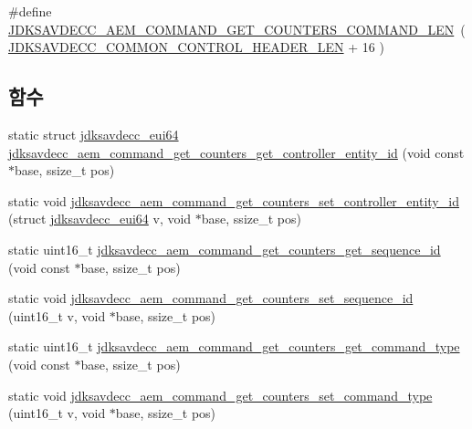 \begin{DoxyCompactItemize}
\item 
\#define \hyperlink{group__command__get__counters_ga172bfd9e43b26f1b23588cdc172e6940}{J\+D\+K\+S\+A\+V\+D\+E\+C\+C\+\_\+\+A\+E\+M\+\_\+\+C\+O\+M\+M\+A\+N\+D\+\_\+\+G\+E\+T\+\_\+\+C\+O\+U\+N\+T\+E\+R\+S\+\_\+\+C\+O\+M\+M\+A\+N\+D\+\_\+\+L\+EN}~( \hyperlink{group__jdksavdecc__avtp__common__control__header_gaae84052886fb1bb42f3bc5f85b741dff}{J\+D\+K\+S\+A\+V\+D\+E\+C\+C\+\_\+\+C\+O\+M\+M\+O\+N\+\_\+\+C\+O\+N\+T\+R\+O\+L\+\_\+\+H\+E\+A\+D\+E\+R\+\_\+\+L\+EN} + 16 )
\end{DoxyCompactItemize}
\subsection*{함수}
\begin{DoxyCompactItemize}
\item 
static struct \hyperlink{structjdksavdecc__eui64}{jdksavdecc\+\_\+eui64} \hyperlink{group__command__get__counters_gafcbe6182e6921a8e503aaaa696b94da6}{jdksavdecc\+\_\+aem\+\_\+command\+\_\+get\+\_\+counters\+\_\+get\+\_\+controller\+\_\+entity\+\_\+id} (void const $\ast$base, ssize\+\_\+t pos)
\item 
static void \hyperlink{group__command__get__counters_ga324bee9854e871ecb2f72c7a27f3cb55}{jdksavdecc\+\_\+aem\+\_\+command\+\_\+get\+\_\+counters\+\_\+set\+\_\+controller\+\_\+entity\+\_\+id} (struct \hyperlink{structjdksavdecc__eui64}{jdksavdecc\+\_\+eui64} v, void $\ast$base, ssize\+\_\+t pos)
\item 
static uint16\+\_\+t \hyperlink{group__command__get__counters_ga8d87faebf1d5bcea5ce764815fb08678}{jdksavdecc\+\_\+aem\+\_\+command\+\_\+get\+\_\+counters\+\_\+get\+\_\+sequence\+\_\+id} (void const $\ast$base, ssize\+\_\+t pos)
\item 
static void \hyperlink{group__command__get__counters_ga593bc64018d2527da7c1462a1399b1a2}{jdksavdecc\+\_\+aem\+\_\+command\+\_\+get\+\_\+counters\+\_\+set\+\_\+sequence\+\_\+id} (uint16\+\_\+t v, void $\ast$base, ssize\+\_\+t pos)
\item 
static uint16\+\_\+t \hyperlink{group__command__get__counters_ga9786fab9f3a79184536150c1a9f79e9f}{jdksavdecc\+\_\+aem\+\_\+command\+\_\+get\+\_\+counters\+\_\+get\+\_\+command\+\_\+type} (void const $\ast$base, ssize\+\_\+t pos)
\item 
static void \hyperlink{group__command__get__counters_ga3f88646071544a74f11b9b835d7b5136}{jdksavdecc\+\_\+aem\+\_\+command\+\_\+get\+\_\+counters\+\_\+set\+\_\+command\+\_\+type} (uint16\+\_\+t v, void $\ast$base, ssize\+\_\+t pos)

\end{DoxyCompactItemize}
